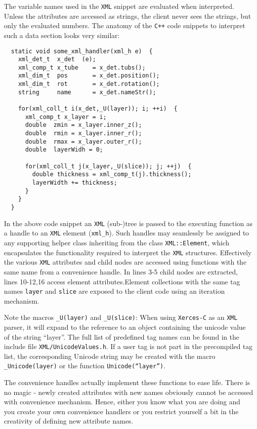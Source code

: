 The variable names used in the \texttt{XML} snippet are evaluated when interpreted. Unless the attributes are accessed as strings, the client never sees the strings, but only the evaluated numbers. The anatomy of the \texttt{C++} code snippets to interpret such a data section looks very similar:
\begin{verbatim}
  static void some_xml_handler(xml_h e)  {
    xml_det_t  x_det  (e);
    xml_comp_t x_tube    = x_det.tubs();
    xml_dim_t  pos       = x_det.position();
    xml_dim_t  rot       = x_det.rotation();
    string     name      = x_det.nameStr();
      
    for(xml_coll_t i(x_det,_U(layer)); i; ++i)  {
      xml_comp_t x_layer = i;
      double  zmin = x_layer.inner_z();
      double  rmin = x_layer.inner_r();
      double  rmax = x_layer.outer_r();
      double  layerWidh = 0;
        
      for(xml_coll_t j(x_layer,_U(slice)); j; ++j)  {
        double thickness = xml_comp_t(j).thickness();
        layerWidth += thickness;
      }
    }
  }
\end{verbatim}
In the above code snippet an \texttt{XML} (sub-)tree is passed to the executing function as a handle to an \texttt{XML} element ({\texttt{xml\_h}}). Such handles may seamlessly be assigned to any supporting helper class inheriting from the class {\texttt{XML::Element}}, which encapsulates the functionality required to interpret the \texttt{XML} structures. Effectively the various \texttt{XML} attributes and child nodes are accessed using functions with the same name from a convenience handle. In lines 3-5 child nodes are extracted, lines 10-12,16 access element attributes.Element collections with the same tag names \texttt{layer} and \texttt{slice} are exposed to the client code using an iteration mechanism.

Note the macros \texttt{\_U(layer)} and \texttt{\_U(slice)}:  When using \texttt{Xerces-C} as an \texttt{XML} parser, it will expand to the reference to an object containing the unicode value of the string ``layer''. The full list of predefined tag names can be found in the include file \texttt{XML/UnicodeValues.h}. If a user tag is not part in the precompiled tag list, the corresponding Unicode string may be created with the macro \texttt{\_Unicode(layer)} or the function \texttt{Unicode(``layer'')}.

The convenience handles actually implement these functions to ease life. There is no magic - newly created attributes with new names obviously cannot be accessed with convenience mechanism. Hence, either you know what you are doing and you create your own convenience handlers or you restrict yourself a bit in the creativity of defining new attribute names.


